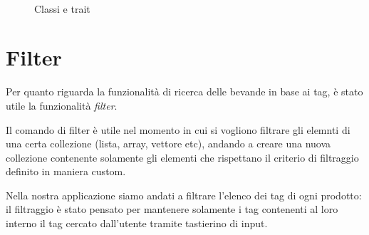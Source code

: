 \begin{figure}[h]
	\centering
	 \quad
	 \\
	 \quad
	\caption{Classi e trait}
	\label{fig:classi&traits}
\end{figure}


\newpage
\section{Filter}
Per quanto riguarda la funzionalità di ricerca delle bevande in base ai tag, è stato utile la funzionalità \textit{filter}.

Il comando di filter è utile nel momento in cui si vogliono filtrare gli elemnti di una certa collezione (lista, array, vettore etc), andando a creare una nuova collezione contenente solamente gli elementi che rispettano il criterio di filtraggio definito in maniera custom.

Nella nostra applicazione siamo andati a filtrare l'elenco dei tag di ogni prodotto: il filtraggio è stato pensato per mantenere solamente i tag contenenti al loro interno il tag cercato dall'utente tramite tastierino di input.

